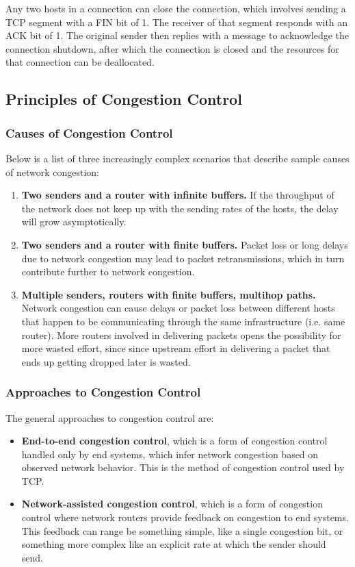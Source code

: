 \documentclass[12pt,titlepage]{article}
\begin{document}
        Any two hosts in a connection can close the connection, which involves sending a TCP segment with a FIN bit of 1. The receiver of that segment responds with an ACK bit of 1. The
        original sender then replies with a message to acknowledge the connection shutdown, after which the connection is closed and the resources for that connection can be deallocated.

    \subsection{Principles of Congestion Control}

      \subsubsection{Causes of Congestion Control}
        Below is a list of three increasingly complex scenarios that describe sample causes of network congestion:
        \begin{enumerate}
          \item \textbf{Two senders and a router with infinite buffers.} If the throughput of the network does not keep up with the sending rates of the hosts, the delay will grow
            asymptotically.
          \item \textbf{Two senders and a router with finite buffers.} Packet loss or long delays due to network congestion may lead to packet retransmissions, which in turn contribute
            further to network congestion.
          \item \textbf{Multiple senders, routers with finite buffers, multihop paths.} Network congestion can cause delays or packet loss between different hosts that happen to be
            communicating through the same infrastructure (i.e. same router). More routers involved in delivering packets opens the possibility for more wasted effort, since since
            upstream effort in delivering a packet that ends up getting dropped later is wasted.
        \end{enumerate}

      \subsubsection{Approaches to Congestion Control}
        The general approaches to congestion control are:
        \begin{itemize}
          \item \textbf{End-to-end congestion control}, which is a form of congestion control handled only by end systems, which infer network congestion based on observed network behavior. 
            This is the method of congestion control used by TCP.
          \item \textbf{Network-assisted congestion control}, which is a form of congestion control where network routers provide feedback on congestion to end systems. This feedback can
            range be something simple, like a single congestion bit, or something more complex like an explicit rate at which the sender should send.
        \end{itemize}
\end{document}
